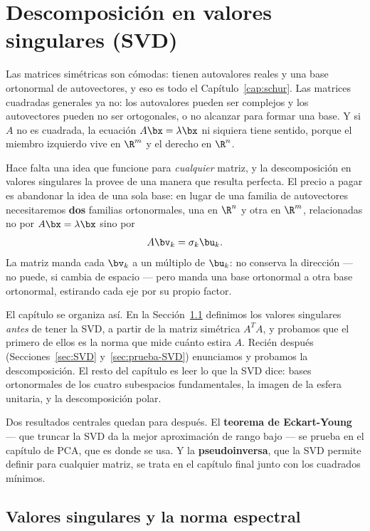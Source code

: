 \chapter{Descomposición en valores singulares (SVD)}\label{cap:SVD}

Las matrices simétricas son cómodas: tienen autovalores reales y una base
ortonormal de autovectores, y eso es todo el Capítulo~\ref{cap:schur}. Las
matrices cuadradas generales ya no: los autovalores pueden ser complejos y
los autovectores pueden no ser ortogonales, o no alcanzar para formar una
base. Y si $A$ no es cuadrada, la ecuación $A\bx=\lambda\bx$ ni siquiera tiene
sentido, porque el miembro izquierdo vive en $\R^m$ y el derecho en $\R^n$.

Hace falta una idea que funcione para \emph{cualquier} matriz, y la
descomposición en valores singulares la provee de una manera que resulta
perfecta. El precio a pagar es abandonar la idea de una sola base: en lugar de
una familia de autovectores necesitaremos \textbf{dos} familias ortonormales,
una en $\R^n$ y otra en $\R^m$, relacionadas no por $A\bx=\lambda\bx$ sino por
\[
A\bv_k=\sigma_k\bu_k .
\]
La matriz manda cada $\bv_k$ a un múltiplo de $\bu_k$: no conserva la
dirección --- no puede, si cambia de espacio --- pero manda una base
ortonormal a otra base ortonormal, estirando cada eje por su propio factor.

El capítulo se organiza así. En la Sección~\ref{sec:sigma1} definimos los
valores singulares \emph{antes} de tener la SVD, a partir de la matriz
simétrica $A^TA$, y probamos que el primero de ellos es la norma que mide
cuánto estira $A$. Recién después (Secciones~\ref{sec:SVD}
y~\ref{sec:prueba-SVD}) enunciamos y probamos la descomposición. El resto del
capítulo es leer lo que la SVD dice: bases ortonormales de los cuatro
subespacios fundamentales, la imagen de la esfera unitaria, y la
descomposición polar.

Dos resultados centrales quedan para después. El \textbf{teorema de
Eckart-Young} --- que truncar la SVD da la mejor aproximación de rango bajo
--- se prueba en el capítulo de PCA, que es donde se usa. Y la
\textbf{pseudoinversa}, que la SVD permite definir para cualquier matriz, se
trata en el capítulo final junto con los cuadrados mínimos.

\section{Valores singulares y la norma espectral}
\label{sec:sigma1}

